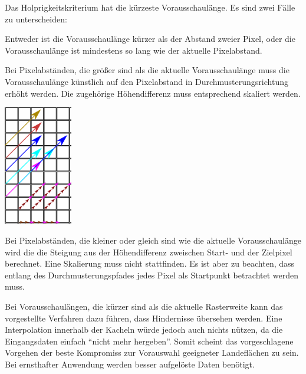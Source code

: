\documentclass[
11pt, %
a4paper, %
oneside, %
pdfspacing, %
headinclude,
BCOR5mm, %
ngerman, %
bibtotocnumbered,
]{scrartcl}
\begin{document}
	
	
	Das Holprigkeitskriterium hat die kürzeste Vorausschaulänge. Es sind zwei Fälle zu unterscheiden: 
	
	Entweder ist die Vorausschaulänge kürzer als der Abstand zweier Pixel, oder die Vorausschaulänge ist mindestens so lang wie der aktuelle Pixelabstand.
	
	Bei Pixelabständen, die größer sind als die aktuelle Vorausschaulänge muss die Vorausschaulänge künstlich auf den Pixelabstand in Durchmusterungsrichtung erhöht werden. Die zugehörige Höhendifferenz muss entsprechend skaliert werden. 
	
	 	\begin{minipage}{\textwidth}
		\skippingparagraph
		
		\begin{minipage}[t]{3cm}
			\vspace{0pt}
			\centering
			\includegraphics[width=3cm]{./drawings/Vorausschaulaengen.png}
		\end{minipage}
			\begin{minipage}[t]{\textwidth-3cm}
				\vspace{0pt}
				Bei Pixelabständen, die kleiner oder gleich sind wie die aktuelle Vorausschaulänge wird die die Steigung aus der Höhendifferenz zweischen Start- und der Zielpixel berechnet. Eine Skalierung muss nicht stattfinden. Es ist aber zu beachten, dass entlang des Durchmusterungspfades jedes Pixel als Startpunkt betrachtet werden muss.			
		\end{minipage}\skippingparagraph
	\end{minipage}

	Bei Vorausschaulängen, die kürzer sind als die aktuelle Rasterweite kann das vorgestellte Verfahren dazu führen, dass Hindernisse übersehen werden. Eine Interpolation innerhalb der Kacheln würde jedoch auch nichts nützen, da die Eingangsdaten einfach "`nicht mehr hergeben"'. Somit scheint das vorgeschlagene Vorgehen der beste Kompromiss zur Vorauswahl geeigneter Landeflächen zu sein. Bei ernsthafter Anwendung werden besser aufgelöste Daten benötigt.
	
\end{document}
